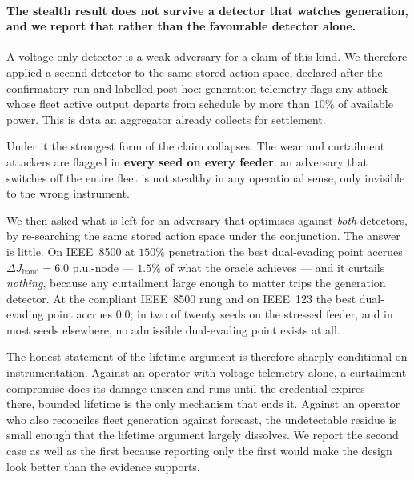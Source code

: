 \paragraph{The stealth result does not survive a detector that watches generation, and we report
that rather than the favourable detector alone.} A voltage-only detector is a weak adversary for a
claim of this kind. We therefore applied a second detector to the same stored action space,
declared after the confirmatory run and labelled post-hoc: generation telemetry flags any attack
whose fleet active output departs from schedule by more than $10\%$ of available power. This is
data an aggregator already collects for settlement.

Under it the strongest form of the claim collapses. The wear and curtailment attackers are flagged
in \textbf{every seed on every feeder}: an adversary that switches off the entire fleet is not
stealthy in any operational sense, only invisible to the wrong instrument.

We then asked what is left for an adversary that optimises against \emph{both} detectors, by
re-searching the same stored action space under the conjunction. The answer is little. On
IEEE~8500 at $150\%$ penetration the best dual-evading point accrues
$\Delta J_{\mathrm{band}} = 6.0$ p.u.-node --- $1.5\%$ of what the oracle achieves --- and it
curtails \emph{nothing}, because any curtailment large enough to matter trips the generation
detector. At the compliant IEEE~8500 rung and on IEEE~123 the best dual-evading point accrues
$0.0$; in two of twenty seeds on the stressed feeder, and in most seeds elsewhere, no admissible
dual-evading point exists at all.

The honest statement of the lifetime argument is therefore sharply conditional on
instrumentation. Against an operator with voltage telemetry alone, a curtailment compromise does
its damage unseen and runs until the credential expires --- there, bounded lifetime is the only
mechanism that ends it. Against an operator who also reconciles fleet generation against forecast,
the undetectable residue is small enough that the lifetime argument largely dissolves. We report
the second case as well as the first because reporting only the first would make the design look
better than the evidence supports.

